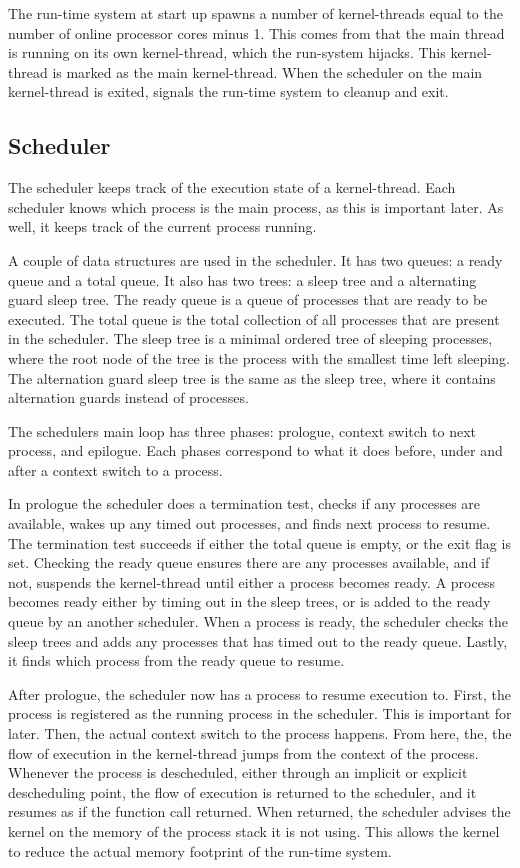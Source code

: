 The run\hyp{}time system at start up spawns a number of kernel\hyp{}threads equal to the number of online processor cores minus 1. This comes from that the main thread is running on its own kernel\hyp{}thread, which the run\hyp{}system hijacks. This kernel\hyp{}thread is marked as the main kernel\hyp{}thread. When the scheduler on the main kernel\hyp{}thread is exited, signals the run\hyp{}time system to cleanup and exit. 


\subsection{Scheduler}

The scheduler keeps track of the execution state of a kernel\hyp{}thread. Each scheduler knows which process is the main process, as this is important later. As well, it keeps track of the current process running. 

A couple of data structures are used in the scheduler. It has two queues: a ready queue and a total queue. It also has two trees: a sleep tree and a alternating guard sleep tree. The ready queue is a queue of processes that are ready to be executed. The total queue is the total collection of all processes that are present in the scheduler. The sleep tree is a minimal ordered tree of sleeping processes, where the root node of the tree is the process with the smallest time left sleeping. The alternation guard sleep tree is the same as the sleep tree, where it contains alternation guards instead of processes.

The schedulers main loop has three phases: prologue, context switch to next process, and epilogue. Each phases correspond to what it does before, under and after a context switch to a process. 

In prologue the scheduler does a termination test, checks if any processes are available, wakes up any timed out processes, and finds next process to resume. The termination test succeeds if either the total queue is empty, or the exit flag is set. Checking the ready queue ensures there are any processes available, and if not, suspends the kernel\hyp{}thread until either a process becomes ready. A process becomes ready either by timing out in the sleep trees, or is added to the ready queue by an another scheduler. When a process is ready, the scheduler checks the sleep trees and adds any processes that has timed out to the ready queue. Lastly, it finds which process from the ready queue to resume.

After prologue, the scheduler now has a process to resume execution to. First, the process is registered as the running process in the scheduler. This is important for later. Then, the actual context switch to the process happens. From here, the, the flow of execution in the kernel\hyp{}thread jumps from the context of the process. Whenever the process is descheduled, either through an implicit or explicit descheduling point, the flow of execution is returned to the scheduler, and it resumes as if the function call returned. When returned, the scheduler advises the kernel on the memory of the process stack it is not using. This allows the kernel to reduce the actual memory footprint of the run\hyp{}time system.

